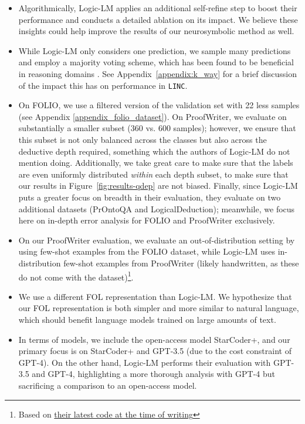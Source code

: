 \begin{itemize}
    \item Algorithmically, Logic-LM applies an additional self-refine step to boost their performance and conducts a detailed ablation on its impact. We believe these insights could help improve the results of our neurosymbolic method as well.
    \item While Logic-LM only considers one prediction, we sample many predictions and employ a majority voting scheme, which has been found to be beneficial in reasoning domains \citep{wang2022self}. See Appendix~\ref{appendix:k_way} for a brief discussion of the impact this has on performance in \texttt{LINC}.
    \item On FOLIO, we use a filtered version of the validation set with 22 less samples (see Appendix \ref{appendix_folio_dataset}). On ProofWriter, we evaluate on substantially a smaller subset (360 vs. 600 samples); however, we ensure that this subset is not only balanced across the classes but also across the deductive depth required, something which the authors of Logic-LM do not mention doing. Additionally, we take great care to make sure that the labels are even uniformly distributed \emph{within} each depth subset, to make sure that our results in Figure~\ref{fig:results-qdep} are not biased. Finally, since Logic-LM puts a greater focus on breadth in their evaluation, they evaluate on two additional datasets (PrOntoQA and LogicalDeduction); meanwhile, we focus here on in-depth error analysis for FOLIO and ProofWriter exclusively.
    \item On our ProofWriter evaluation, we evaluate an out-of-distribution setting by using few-shot examples from the FOLIO dataset, while Logic-LM uses in-distribution few-shot examples from ProofWriter (likely handwritten, as these do not come with the dataset)\footnote{Based on \href{https://github.com/teacherpeterpan/Logic-LLM/blob/3c13afd0cb9f4a7391ebe2609ef9330e743f0965/models/prompt_library.py}{their latest code at the time of writing}}.
    \item We use a different FOL representation than Logic-LM. We hypothesize that our FOL representation is both simpler and more similar to natural language, which should benefit language models trained on large amounts of text.
    \item In terms of models, we include the open-access model StarCoder+, and our primary focus is on StarCoder+ and GPT-3.5 (due to the cost constraint of GPT-4). On the other hand, Logic-LM performs their evaluation with GPT-3.5 and GPT-4, highlighting a more thorough analysis with GPT-4 but sacrificing a comparison to an open-access model.

\end{itemize}
